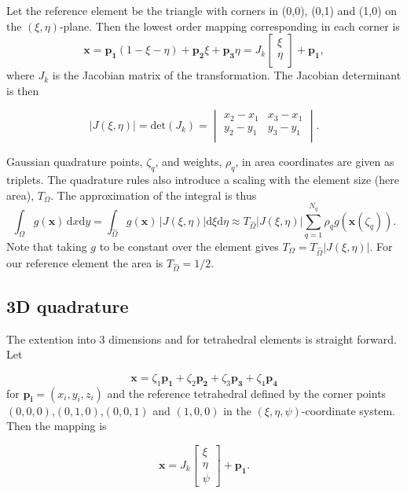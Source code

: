 \documentclass[paper=a4, fontsize=11pt]{scrartcl} %
\begin{document}
Let the reference element be the triangle with corners in (0,0), (0,1) and (1,0) on the $(\xi,\eta)$-plane. Then the lowest order mapping corresponding in each corner is
\[ \mathbf{x}= \mathbf{p_1}(1-\xi-\eta) +\mathbf{p_2}\xi +\mathbf{p_3}\eta = J_k\left[ \begin{array}{c} \xi\\ \eta\\ \end{array} \right] + \mathbf{p_1},
\]
where $J_k$ is the Jacobian matrix of the transformation. The Jacobian determinant is then

\begin{equation}
|J(\xi,\eta)| = \mathrm{det}(J_k) = \begin{vmatrix}
  x_2-x_1 & x_3-x_1 \\
  y_2-y_1 & y_3-y_1 \\
\end{vmatrix}.
  \label{eq:jacobian2d}
\end{equation}

Gaussian quadrature points, $\zeta_q$, and weights, $\rho_q$, in area coordinates are given as triplets. The quadrature rules also introduce a scaling with the element size (here area), $T_\Omega$. The approximation of the integral is thus
\[ \int_{\Omega} \! g(\mathbf{x}) \, \mathrm{d}x\mathrm{d}y = \int_{\hat{\Omega}} \! g(\mathbf{x}) \, |J(\xi,\eta)| \mathrm{d}\xi \mathrm{d}\eta \approx T_{\hat{\Omega}} |J(\xi,\eta)| \sum_{q=1}^{N_q} \rho_{q}g(\mathbf{x}(\zeta_q)).
\]
Note that taking $g$ to be constant over the element gives $T_{\Omega}=T_{\hat{\Omega}} |J(\xi,\eta)|$. For our reference element the area is $T_{\hat{\Omega}}=1/2$.

\subsection{3D quadrature}
The extention into 3 dimensions and for tetrahedral elements is straight forward. Let

\[ \mathbf{x} = \zeta_1\mathbf{p_1} +\zeta_2\mathbf{p_2} +\zeta_3\mathbf{p_3} + \zeta_4\mathbf{p_4} 
\]
for $\mathbf{p_i} =(x_i,y_i,z_i)$ and the reference tetrahedral defined by the corner points $(0,0,0)$,$(0,1,0)$,$(0,0,1)$ and $(1,0,0)$ in the $(\xi,\eta,\psi)$-coordinate system. Then the mapping is

\[ \mathbf{x}= J_k\left[ \begin{array}{c} \xi\\ \eta\\ \psi \end{array} \right] + \mathbf{p_1}.
\]
\end{document}
